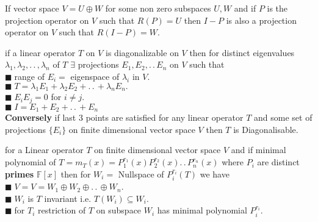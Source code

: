 \documentclass[11pt]{extarticle}
\newcommand{\F}{\mathbb{F}}
\newcommand{\ck}{.\,.\,}
\newcommand{\tbx}[2][]{
	\begin{tcolorbox}[enhanced,breakable,size=small,colback=black!2!white,title={#1},arc is angular, arc=1.5mm,drop fuzzy shadow]
		#2
	\end{tcolorbox}
}
\newcommand{\yi}{\\$\blacksquare\;$}
\begin{document}
\begin{multicols}{2}
   	 \tbx{ If vector space $ V=U\oplus W$ for some non zero subspaces $ U,W $ and if $ P $ is the projection operator on $ V $ such that $ R(P)=U $ then $ I-P $ is also a projection operator on $ V $ such that $ R(I-P)=W .$   }
   	\tbx[Diagonalizability and Projections]{ if a linear operator $ T $ on $ V $  is diagonalizable on  $ V $ then for distinct eigenvalues $ \lambda_1,\lambda_2,\ck, \lambda_n$ of $ T $ $ \exists $ projections $ E_1,E_2,\ck E_n $ on $ V $ such that
   	\yi range of $ E_i = $ eigenspace of $ \lambda_i $ in $ V $.
   	\yi $ T=\lambda_1 E_1+\lambda_2 E_2 +\ck +\lambda_n E_n .$
   	\yi $ E_iE_j=0 $ for $ i\neq j $.
   	\yi $ I=E_1+E_2+\ck +E_n $ \\
   	  \textbf{Conversely} if last 3 points are satisfied for any linear operator $ T $ and some set of projections $ \{E_i\} $ on finite dimensional vector space $ V $ then $ T $ is Diagonalisable.}
   	  \tbx[Primary Decomposition Theorem]{ for a Linear operator $ T $ on finite dimensional vector space $ V $ and if minimal polynomial of $ T =m_T(x)=P_1^{r_1}(x)P_2^{r_2}(x)\ck P_n^{r_n}(x)$ where $ P_i $ are distinct \textbf{primes} $ \F[x] $ then for $ W_i = $ Nullspace of $ P_i^{r_i}(T) $ we have
   	  \yi $ V=   V= W_1\oplus W_2 \oplus \ck \oplus W_n$. 
   	  \yi $ W_i $ is $ T $ invariant i.e. $ T(W_i)\subseteq W_i. $ 
   	  \yi for $ T_i $ restriction of $ T $ on subspace $ W_i $ has minimal polynomial $ P_i^{r_i} $.}
   	  
   	  \newcolumn

\end{multicols}
\end{document}
